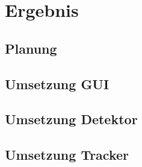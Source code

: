 \chapter{Ergebnis}
\label{ch:ergebnis}

\section{Planung}

\section{Umsetzung GUI}

\section{Umsetzung Detektor}

\section{Umsetzung Tracker}
